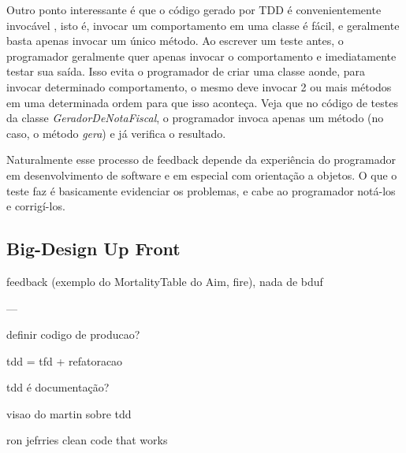 Outro ponto interessante é que o código gerado por TDD é convenientemente invocável \cite{bob-martin}, isto é, invocar um comportamento em uma classe
é fácil, e geralmente basta apenas invocar um único método. Ao escrever um teste antes, o programador geralmente quer apenas invocar
o comportamento e imediatamente testar sua saída. Isso evita o programador de criar uma classe aonde, para invocar determinado comportamento,
o mesmo deve invocar 2 ou mais métodos em uma determinada ordem para que isso aconteça. 
Veja que no código de testes da classe \textit{GeradorDeNotaFiscal}, o programador
invoca apenas um método (no caso, o método \textit{gera}) e já verifica o resultado. 

Naturalmente esse processo de feedback depende da experiência do programador em desenvolvimento de software e em especial 
com orientação a objetos. O que o teste faz é basicamente evidenciar os problemas, e cabe ao programador notá-los e
corrigí-los.
 
\subsection{Big-Design Up Front}





feedback (exemplo do MortalityTable do Aim, fire), nada de bduf


---


definir codigo de producao?


tdd = tfd + refatoracao

tdd é documentação?

visao do martin sobre tdd

ron jefrries clean code that works

